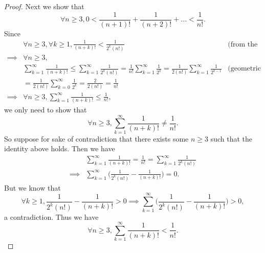 \begin{proof}
  Next we show that
  \[
    \forall n \geq 3, 0 < \frac{1}{(n + 1)!} + \frac{1}{(n + 2)!} + \dots < \frac{1}{n!}.
  \]
  Since
  \begin{align*}
             & \forall n \geq 3, \forall k \geq 1, \frac{1}{(n + k)!} < \frac{1}{2^k (n!)}                                                                                                                    & \text{(from the proof above)} \\
    \implies & \forall n \geq 3,                                                                                                                                                                                                              \\
             & \sum_{k = 1}^\infty \frac{1}{(n + k)!} \leq \sum_{k = 1}^\infty \frac{1}{2^k (n!)} = \frac{1}{n!} \sum_{k = 1}^\infty \frac{1}{2^k} = \frac{1}{2 (n!)} \sum_{k = 1}^\infty \frac{1}{2^{k - 1}} & \text{(geometric series)}     \\
             & = \frac{1}{2 (n!)} \sum_{k = 0}^\infty \frac{1}{2^k} = \frac{2}{2 (n!)} = \frac{1}{n!}                                                                                                                                         \\
    \implies & \forall n \geq 3, \sum_{k = 1}^\infty \frac{1}{(n + k)!} \leq \frac{1}{n!},
  \end{align*}
  we only need to show that
  \[
    \forall n \geq 3, \sum_{k = 1}^\infty \frac{1}{(n + k)!} \neq \frac{1}{n!}.
  \]
  So suppose for sake of contradiction that there exists some \(n \geq 3\) such that the identity above holds.
  Then we have
  \begin{align*}
             & \sum_{k = 1}^\infty \frac{1}{(n + k)!} = \frac{1}{n!} = \sum_{k = 1}^\infty \frac{1}{2^k (n!)} \\
    \implies & \sum_{k = 1}^\infty \bigg(\frac{1}{2^k (n!)} - \frac{1}{(n + k)!}\bigg) = 0.
  \end{align*}
  But we know that
  \[
    \forall k \geq 1, \frac{1}{2^k (n!)} - \frac{1}{(n + k)!} > 0 \implies \sum_{k = 1}^\infty \bigg(\frac{1}{2^k (n!)} - \frac{1}{(n + k)!}\bigg) > 0,
  \]
  a contradiction.
  Thus we have
  \[
    \forall n \geq 3, \sum_{k = 1}^\infty \frac{1}{(n + k)!} < \frac{1}{n!}.
  \]


\end{proof}
